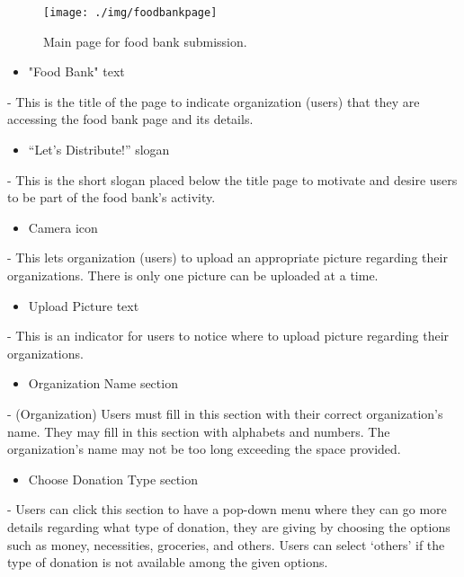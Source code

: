 \documentclass[conference]{IEEEtran}
\begin{document}
\begin{figure}[h!]
\texttt{[image: ./img/foodbankpage]}
\centering
\caption{Main page for food bank submission.}
\end{figure}


\begin{itemize}
\item "Food Bank" text
\end{itemize}

- This is the title of the page to indicate organization (users) that they are accessing the food bank page and its details.\\

\begin{itemize}
\item “Let’s Distribute!” slogan
\end{itemize}

- This is the short slogan placed below the title page to motivate and desire users to be part of the food bank’s activity. \\
\begin{itemize}
\item Camera icon
\end{itemize}
- This lets organization (users) to upload an appropriate picture regarding their organizations. There is only one picture can be uploaded at a time.\\

\begin{itemize}
\item Upload Picture text
\end{itemize}
- This is an indicator for users to notice where to upload picture regarding their organizations. \\

\begin{itemize}
\item Organization Name section
\end{itemize}
- (Organization) Users must fill in this section with their correct organization’s name. They may fill in this section with alphabets and numbers. The organization’s name may not be too long exceeding the space provided.\\

\begin{itemize}
\item Choose Donation Type section
\end{itemize}
- Users can click this section to have a pop-down menu where they can go more details regarding what type of donation, they are giving by choosing the options such as money, necessities, groceries, and others. Users can select ‘others’ if the type of donation is not available among the given options. \\
\end{document}
